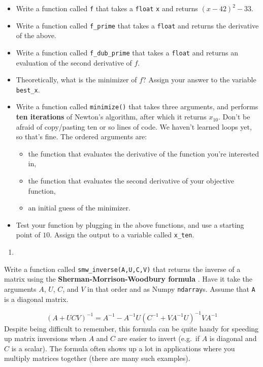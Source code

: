 \documentclass[
  12pt,
  krantz2]{krantz}
\providecommand{\tightlist}{%
  \setlength{\itemsep}{0pt}\setlength{\parskip}{0pt}}
\begin{document}
\begin{itemize}
\tightlist
\item
  Write a function called \texttt{f} that takes a \texttt{float} \texttt{x} and returns \((x-42)^2 - 33\).
\item
  Write a function called \texttt{f\_prime} that takes a \texttt{float} and returns the derivative of the above.
\item
  Write a function called \texttt{f\_dub\_prime} that takes a \texttt{float} and returns an evaluation of the second derivative of \(f\).
\item
  Theoretically, what is the minimizer of \(f\)? Assign your answer to the variable \texttt{best\_x}.
\item
  Write a function called \texttt{minimize()} that takes three arguments, and performs \textbf{ten iterations} of Newton's algorithm, after which it returns \(x_{10}\). Don't be afraid of copy/pasting ten or so lines of code. We haven't learned loops yet, so that's fine. The ordered arguments are:

  \begin{itemize}
  \tightlist
  \item
    the function that evaluates the derivative of the function you're interested in,
  \item
    the function that evaluates the second derivative of your objective function,
  \item
    an initial guess of the minimizer.
  \end{itemize}
\item
  Test your function by plugging in the above functions, and use a starting point of \(10\). Assign the output to a variable called \texttt{x\_ten}.
\end{itemize}

\begin{enumerate}
\def\labelenumi{\arabic{enumi}.}
\setcounter{enumi}{1}
\tightlist
\item
\end{enumerate}

Write a function called \texttt{smw\_inverse(A,U,C,V)} that returns the inverse of a matrix using the \textbf{Sherman-Morrison-Woodbury formula} \citep{woodbury}. Have it take the arguments \(A\), \(U\), \(C\), and \(V\) in that order and as Numpy \texttt{ndarray}s. Assume that \texttt{A} is a diagonal matrix.

\[
(A + UCV)^{-1} = A^{-1} - A^{-1}U(C^{-1} + VA^{-1}U)^{-1}V A^{-1}
\]
Despite being difficult to remember, this formula can be quite handy for speeding up matrix inversions when \(A\) and \(C\) are easier to invert (e.g.~if \(A\) is diagonal and \(C\) is a scalar). The formula often shows up a lot in applications where you multiply matrices together (there are many such examples).
\end{document}
